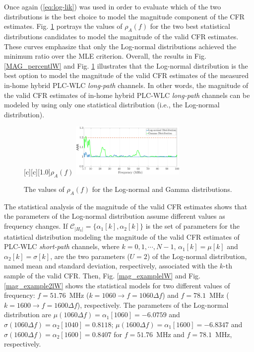 \documentclass[journal]{IEEEtran}
\begin{document}
Once again (\ref{eq:log-lik}) was used in order to evaluate which of the two distributions is the best choice to model the magnitude component of the \ac{CFR} estimates. Fig. \ref{fig:Log_likelW} portrays the values of  $\rho_{A}(f)$ for the two best statistical distributions candidates to model the magnitude of the valid \ac{CFR} estimates. These curves emphasize that only the Log-normal distributions achieved the minimum ratio over the \ac{MLE} criterion. Overall, the results in Fig. \ref{MAG_percentlW} and Fig. \ref{fig:Log_likelW} illustrates that the Log-normal distribution is the best option to model the magnitude of the valid \ac{CFR} estimates of the measured in-home hybrid \ac{PLC}-\ac{WLC} \textit{long-path} channels. In other words, the magnitude of the valid \ac{CFR} estimates of in-home hybrid \ac{PLC}-\ac{WLC} \textit{long-path} channels can be modeled by using only one statistical distribution (i.e., the Log-normal distribution).

\begin{figure}[h!]
	\centering
	[c][1.0]{$\rho_{A} (f)$}
	\includegraphics[width=0.49\textwidth]{images/Log_Lognormal_GammalW.eps}
	\caption{The values of $\rho_{A} (f)$ for the Log-normal and Gamma distributions.}
	\label{fig:Log_likelW}
\end{figure}

The statistical analysis of the magnitude of the valid \ac{CFR} estimates shows that the parameters of the Log-normal distribution assume different values as frequency changes. If $\mathcal{C}_{|H_k|} = \{\alpha_1[k],\alpha_2[k]\}$ is the set of parameters for the statistical distribution modeling the magnitude of the valid \ac{CFR} estimates of \ac{PLC}-\ac{WLC} \textit{short-path} channels, where $k=0,1,\cdots,N-1$,  $\alpha_1[k] = \mu[k]$ and $\alpha_2[k] = \sigma[k]$, are the two parameters ($U=2$) of the Log-normal distribution, named mean and standard deviation, respectively, associated with the $k$-th sample of the valid \ac{CFR}. Then, Fig. \ref{mag_examplelW} and Fig. \ref{mag_example2lW} shows the statistical models for two different values of frequency: $f=51.76$~MHz ($k=1060 \rightarrow f = 1060\Delta f$) and $f=78.1$~MHz ($k=1600 \rightarrow f = 1600\Delta f$), respectively. The parameters of the Log-normal distribution are  $\mu(1060 \Delta f) = \alpha_1[1060]=-6.0759$ and $\sigma( 1060 \Delta f) = \alpha_2[1040] = 0.8118$; $\mu(1600 \Delta f) = \alpha_1[1600] = -6.8347$ and $\sigma( 1600 \Delta f) = \alpha_2[1600]=0.8407$ for $f=51.76$~MHz and $f=78.1$~MHz, respectively.
\end{document}
